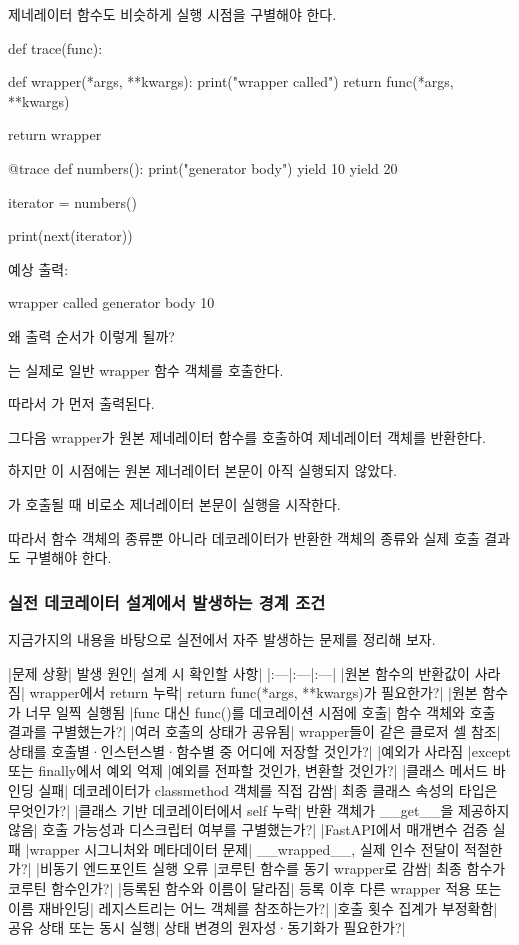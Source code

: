 제네레이터 함수도 비슷하게 실행 시점을 구별해야 한다.

\begin{dhkcode}
def trace(func):

    def wrapper(*args, **kwargs):
        print("wrapper called")
        return func(*args, **kwargs)

    return wrapper


@trace
def numbers():
    print("generator body")
    yield 10
    yield 20


iterator = numbers()

print(next(iterator))
\end{dhkcode}

예상 출력:

\begin{dhkzsh}
wrapper called
generator body
10
\end{dhkzsh}

왜 출력 순서가 이렇게 될까?

는 실제로 일반 wrapper 함수 객체를 호출한다.

따라서 가 먼저 출력된다.

그다음 wrapper가 원본 제네레이터 함수를 호출하여 제네레이터 객체를 반환한다.

하지만 이 시점에는 원본 제너레이터 본문이 아직 실행되지 않았다.

가 호출될 때 비로소 제너레이터 본문이 실행을 시작한다.

따라서 함수 객체의 종류뿐 아니라 데코레이터가 반환한 객체의 종류와 실제 호출 결과도 구별해야 한다.

\subsubsection{실전 데코레이터 설계에서 발생하는 경계 조건}

지금가지의 내용을 바탕으로 실전에서 자주 발생하는 문제를 정리해 보자.

\begin{dhktable}
|문제 상황|	발생 원인|	설계 시 확인할 사항|
|:---|:---|:---|
|원본 함수의 반환값이 사라짐|	wrapper에서 return 누락|	return func(*args, **kwargs)가 필요한가?|
|원본 함수가 너무 일찍 실행됨	|func 대신 func()를 데코레이션 시점에 호출|	함수 객체와 호출 결과를 구별했는가?|
|여러 호출의 상태가 공유됨|	wrapper들이 같은 클로저 셀 참조|	상태를 호출별·인스턴스별·함수별 중 어디에 저장할 것인가?|
|예외가 사라짐	|except 또는 finally에서 예외 억제	|예외를 전파할 것인가, 변환할 것인가?|
|클래스 메서드 바인딩 실패|	데코레이터가 classmethod 객체를 직접 감쌈|	최종 클래스 속성의 타입은 무엇인가?|
|클래스 기반 데코레이터에서 self 누락|	반환 객체가 __get__을 제공하지 않음|	호출 가능성과 디스크립터 여부를 구별했는가?|
|FastAPI에서 매개변수 검증 실패	|wrapper 시그니처와 메타데이터 문제|	__wrapped__, 실제 인수 전달이 적절한가?|
|비동기 엔드포인트 실행 오류	|코루틴 함수를 동기 wrapper로 감쌈|	최종 함수가 코루틴 함수인가?|
|등록된 함수와 이름이 달라짐|	등록 이후 다른 wrapper 적용 또는 이름 재바인딩|	레지스트리는 어느 객체를 참조하는가?|
|호출 횟수 집계가 부정확함|	공유 상태 또는 동시 실행|	상태 변경의 원자성·동기화가 필요한가?|
\end{dhktable}

